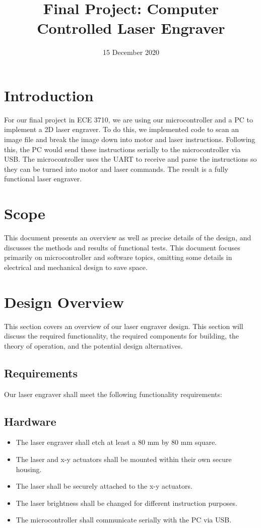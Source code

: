 \documentclass[11pt]{LaTeX-Classes/math-hw}
\title{Final Project: Computer Controlled Laser Engraver}
\date{15 December 2020}
\begin{document}
\maketitle

\section{Introduction}
For our final project in ECE 3710, we are using our microcontroller and a PC to implement a 2D laser engraver. To do this, we implemented code to scan an image file and break the image down into motor and laser instructions. Following this, the PC would send these instructions serially to the microcontroller via USB. The microcontroller uses the UART to receive and parse the instructions so they can be turned into motor and laser commands. The result is a fully functional laser engraver.

\section{Scope}
This document presents an overview as well as precise details of the design,
and discusses the methods and results of functional tests.
This document focuses primarily on microcontroller and software topics,
omitting some details in electrical and mechanical design to save space.

\section{Design Overview}
This section covers an overview of our laser engraver design. This section will discuss the required functionality, the required components for building, the theory of operation, and the potential design alternatives. 
\subsection{Requirements}
Our laser engraver shall meet the following functionality requirements:
\subsection{Hardware}
	\begin{itemize}
		\item The laser engraver shall etch at least a 80 mm by 80 mm square.
		\item The laser and x-y actuators shall be mounted within their own secure housing.
		\item The laser shall be securely attached to the x-y actuators.
		\item The laser brightness shall be changed for different instruction purposes.
		\item The microcontroller shall communicate serially with the PC via USB.
	\end{itemize}
\end{document}
